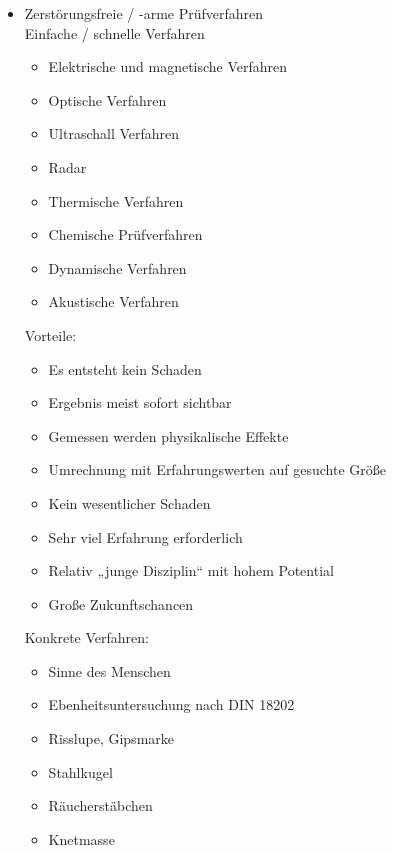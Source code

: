 \documentclass[fleqn,twoside,dvipsnames]{article}
\begin{document}
\begin{itemize}
            \item Zerstörungsfreie / -arme Prüfverfahren\\
            Einfache / schnelle Verfahren
                \begin{itemize}
                    \item Elektrische und magnetische Verfahren
                    \item Optische Verfahren
                    \item Ultraschall Verfahren
                    \item Radar
                    \item Thermische Verfahren
                    \item Chemische Prüfverfahren
                    \item Dynamische Verfahren
                    \item Akustische Verfahren
                \end{itemize}
            Vorteile:
                \begin{itemize}
                    \item Es entsteht kein Schaden
                    \item Ergebnis meist sofort sichtbar
                    \item Gemessen werden physikalische Effekte
                    \item Umrechnung mit Erfahrungswerten auf gesuchte Größe
                    \item Kein wesentlicher Schaden
                    \item Sehr viel Erfahrung erforderlich
                    \item Relativ „junge Disziplin“ mit hohem Potential
                    \item Große Zukunftschancen
                \end{itemize}
            Konkrete Verfahren:
                \begin{itemize}
                    \item Sinne des Menschen
                    \item Ebenheitsuntersuchung nach DIN 18202
                    \item Risslupe, Gipsmarke
                    \item Stahlkugel
                    \item Räucherstäbchen
                    \item Knetmasse

\end{itemize}
\end{itemize}
\end{document}
